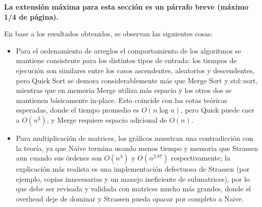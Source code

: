 \begin{mdframed}
    \textbf{La extensión máxima para esta sección es un párrafo breve (máximo 1/4 de página).}
\end{mdframed}

En base a los resultados obtenidos, se observan las siguientes cosas:
\begin{itemize}
    \item Para el ordenamiento de arreglos el comportamiento de los algoritmos se mantiene consistente para los distintos tipos de entrada: los tiempos de ejecución son similares entre los casos ascendentes, aleatorios y descendentes, pero Quick Sort se demora considerablemente más que Merge Sort y std::sort, mientras que en memoria Merge utiliza más espacio y los otros dos se mantienen básicamente in-place.
    Esto coincide con las cotas teóricas esperadas, donde el tiempo promedio es $O(n \log n)$, pero Quick puede caer a $O(n^2)$, y Merge requiere espacio adicional de $O(n)$. 
    
    \item Para multiplicación de matrices, los gráficos muestran una contradicción con la teoría, ya que Naive termina usando menos tiempo y memoria que Strassen aun cuando sus órdenes son $O(n^3)$ y $O(n^{2.87})$ respectivamente; la explicación más realista es una implementación defectuosa de Strassen (por ejemplo, copias innecesarias y un manejo ineficiente de submatrices), por lo que debe ser revisada y validada con matrices mucho más grandes, donde el overhead deje de dominar y Strassen pueda opacar por completo a Naive.

\end{itemize}
